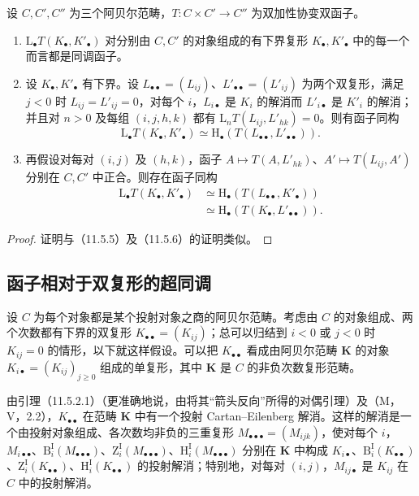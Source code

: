 设 $C,C',C''$ 为三个阿贝尔范畴，$T:C\times C'\to C''$ 为双加性协变双函子。
\begin{enumerate}[label=(\roman*)]
\item $\mathrm L_\bullet T(K_\bullet,K'_\bullet)$ 对分别由 $C,C'$ 的对象组成的有下界复形 $K_\bullet,K'_\bullet$ 中的每一个而言都是同调函子。
\item 设 $K_\bullet,K'_\bullet$ 有下界。设 $L_{\bullet\bullet}=(L_{ij})$、$L'_{\bullet\bullet}=(L'_{ij})$ 为两个双复形，满足 $j<0$ 时 $L_{ij}=L'_{ij}=0$，对每个 $i$，$L_{i\bullet}$ 是 $K_i$ 的解消而 $L'_{i\bullet}$ 是 $K'_i$ 的解消；并且对 $n>0$ 及每组 $(i,j,h,k)$ 都有 $\mathrm L_nT(L_{ij},L'_{hk})=0$。则有函子同构
\begin{equation}\tag{11.6.5.1}
\mathrm L_\bullet T(K_\bullet,K'_\bullet)\simeq\mathrm H_\bullet(T(L_{\bullet\bullet},L'_{\bullet\bullet})).
\end{equation}
\item 再假设对每对 $(i,j)$ 及 $(h,k)$，函子 $A\mapsto T(A,L'_{hk})$、$A'\mapsto T(L_{ij},A')$ 分别在 $C,C'$ 中正合。则存在函子同构
\begin{equation}\tag{11.6.5.2}
\begin{aligned}
\mathrm L_\bullet T(K_\bullet,K'_\bullet)
&\simeq\mathrm H_\bullet(T(L_{\bullet\bullet},K'_\bullet))\\
&\simeq\mathrm H_\bullet(T(K_\bullet,L'_{\bullet\bullet})).
\end{aligned}
\end{equation}
\end{enumerate}
\begin{proof}
证明与（11.5.5）及（11.5.6）的证明类似。
\end{proof}

\subsection{函子相对于双复形的超同调}
设 $C$ 为每个对象都是某个投射对象之商的阿贝尔范畴。考虑由 $C$ 的对象组成、两个次数都有下界的双复形 $K_{\bullet\bullet}=(K_{ij})$；总可以归结到 $i<0$ 或 $j<0$ 时 $K_{ij}=0$ 的情形，以下就这样假设。可以把 $K_{\bullet\bullet}$ 看成由阿贝尔范畴 $\mathbf K$ 的对象 $K_{i\bullet}=(K_{ij})_{j\geq0}$ 组成的单复形，其中 $\mathbf K$ 是 $C$ 的非负次数复形范畴。

由引理（11.5.2.1）（更准确地说，由将其“箭头反向”所得的对偶引理）及（M，V，2.2），$K_{\bullet\bullet}$ 在范畴 $\mathbf K$ 中有一个投射 Cartan--Eilenberg 解消。这样的解消是一个由投射对象组成、各次数均非负的三重复形 $M_{\bullet\bullet\bullet}=(M_{ijk})$，使对每个 $i$，$M_{i\bullet\bullet}$、$\mathrm B_i^{\mathrm I}(M_{\bullet\bullet\bullet})$、$\mathrm Z_i^{\mathrm I}(M_{\bullet\bullet\bullet})$、$\mathrm H_i^{\mathrm I}(M_{\bullet\bullet\bullet})$ 分别在 $\mathbf K$ 中构成 $K_{i\bullet}$、$\mathrm B_i^{\mathrm I}(K_{\bullet\bullet})$、$\mathrm Z_i^{\mathrm I}(K_{\bullet\bullet})$、$\mathrm H_i^{\mathrm I}(K_{\bullet\bullet})$ 的投射解消；特别地，对每对 $(i,j)$，$M_{ij\bullet}$ 是 $K_{ij}$ 在 $C$ 中的投射解消。

